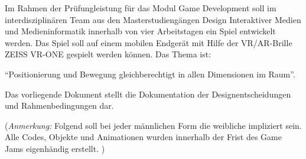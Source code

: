 Im Rahmen der Prüfungleistung für das Modul Game Development soll im interdisziplinären Team aus den Masterstudiengängen Design Interaktiver Medien und Medieninformatik innerhalb von vier Arbeitstagen ein Spiel entwickelt werden. Das Spiel soll auf einem mobilen Endgerät mit Hilfe der VR/AR-Brille ZEISS VR-ONE gespielt werden können. Das Thema ist: 

\enquote{Positionierung und Bewegung gleichberechtigt in allen Dimensionen im Raum}.

Das vorliegende Dokument stellt die Dokumentation der Designentscheidungen und Rahmenbedingungen dar.

(\emph{Anmerkung:} Folgend soll bei jeder männlichen Form die weibliche impliziert sein. Alle Codes, Objekte und Animationen wurden innerhalb der Frist des Game Jams eigenhändig erstellt. )
